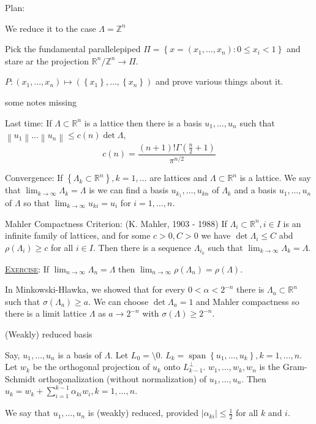 \documentclass{report}
\newcommand{\R}{\mathbb{R}}
\newcommand{\Z}{\mathbb{Z}}
\newcommand{\norm}[1]{\left\| #1 \right\|}
\newcommand{\set}[1]{\left\{ #1 \right\}}
\newcommand{\fancyem}[1]{\underline{\textsc{#1}}}
\theoremstyle{definition}
\theoremstyle{remark}
\numberwithin{equation}{section}
\begin{document}
Plan:

We reduce it to the case $\Lambda = \Z^n$

Pick the fundamental parallelepiped $\Pi = \set{x = (x_1, \ldots, x_n): 0 \leq x_i < 1}$ and stare ar the projection $\R^n/\Z^n \to \Pi$.

$P: (x_1, \ldots, x_n) \mapsto (\set{x_1}, \ldots, \set{x_n})$
and prove various things about it.

some notes missing

Last time:
If $\Lambda \subset \R^n$ is a lattice then there is a basis $u_1, \ldots, u_n$ such that $\norm{u_1} \ldots \norm{u_n} \leq c(n) \det \Lambda$, \[c(n) = \frac{(n+1)!\Gamma\left(\frac{n}{2}+1\right)}{\pi^{n/2}}\]

Convergence:
If $\set{\Lambda_k \subset \R^n}, k = 1, \ldots$ are lattices and $\Lambda \subset \R^n$ is a lattice. We say that $\lim_{k \to \infty} \Lambda_k = \Lambda$ is we can find a basis $u_{k_1}, \ldots, u_{kn}$ of $\Lambda_k$ and a basis $u_1, \ldots, u_n$ of $\Lambda$ so that $\lim_{k \to \infty} u_{ki} = u_i$ for $i = 1, \ldots, n$.

Mahler Compactness Criterion: (K. Mahler, 1903 - 1988)
If $\Lambda_i \subset \R^n, i \in I$ is an infinite family of lattices, and for some $c > 0, C > 0$ we have $\det \Lambda_i \leq C$ abd $\rho(\Lambda_i) \geq c$ for all $i \in I$. Then there is a sequence $\Lambda_{i_k}$ such that $\lim_{k \to \infty} \Lambda_k = \Lambda$.

\fancyem{Exercise}: If $\lim_{n \to \infty} \Lambda_n = \Lambda$ then $\lim_{n \to \infty} \rho(\Lambda_n) = \rho(\Lambda)$.

In Minkowski-Hlawka, we showed that for every $0 < \alpha < 2^{-n}$ there is $\Lambda_a \subset \R^n$ such that $\sigma(\Lambda_a) \geq a$. We can choose $\det \Lambda_a = 1$ and Mahler compactness so there is a limit lattice $\Lambda$ as $a \to 2^{-n}$ with $\sigma(\Lambda) \geq 2^{-n}$.

(Weakly) reduced basis

Say, $u_1, \ldots, u_n$ is a basis of $\Lambda$. Let $L_0 = \setminus{0}$. $L_k = \operatorname{span}\set{u_1, \ldots, u_k}, k = 1, \ldots, n$. Let $w_k$ be the orthogonal projection of $u_k$ onto $L^{\perp}_{k-1}$. $w_1, \ldots, w_k, w_n$ is the Gram-Schmidt orthogonalization (without normalization) of $u_1, \ldots, u_n$. Then $u_k = w_k + \sum_{i=1}^{k-1} \alpha_{ki}w_i, k = 1, \ldots, n$. 

We say that $u_1, \ldots, u_n$ is (weakly) reduced, provided $|\alpha_{ki}| \leq \frac{1}{2}$ for all $k$ and $i$.
\end{document}
